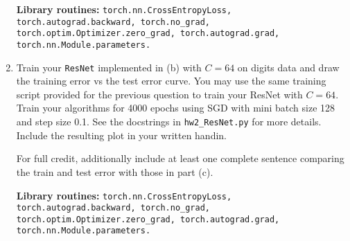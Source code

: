 \begin{Q}
\begin{enumerate}
         \textbf{Library routines:} \texttt{torch.nn.CrossEntropyLoss, torch.autograd.backward, torch.no\_grad, torch.optim.Optimizer.zero\_grad, torch.autograd.grad, torch.nn.Module.parameters.}
         
     \item Train your \texttt{ResNet} implemented in (b) with $C=64$ on digits data and draw the training error vs the test error curve. You may use the same training script provided for the previous question to train your ResNet with $C=64$. Train your algorithms for 4000 epochs using SGD with mini batch size 128 and step size 0.1. See the docstrings in \texttt{hw2\_ResNet.py} for more details. Include the resulting plot in your written handin. 
                
         For full credit, additionally include at least one complete sentence comparing the train and test error with those in part (c).
         
         \textbf{Library routines:} \texttt{torch.nn.CrossEntropyLoss, torch.autograd.backward, torch.no\_grad, torch.optim.Optimizer.zero\_grad, torch.autograd.grad, torch.nn.Module.parameters.}
    \end{enumerate}
\end{Q}
